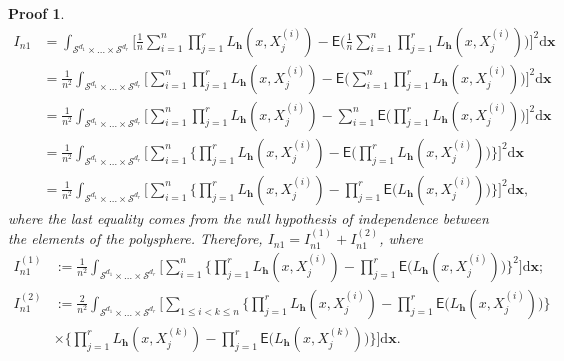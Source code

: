 \documentclass{article}
\newtheorem{Proof}{Proof}[section]
\begin{document}
\begin{Proof}
    \begin{align}
    I_{n1} &= \int_{\mathcal{S}^{d_1} \times \dots \times \mathcal{S}^{d_r}} \Bigg[ \frac{1}{n} \sum_{i=1}^{n} \prod_{j=1}^{r} L_{\mathbf{h}} (x,X_j^{(i)}) - \mathsf{E} \Big( \frac{1}{n} \sum_{i=1}^{n} \prod_{j=1}^{r} L_{\mathbf{h}} (x,X_j^{(i)}) \Big) \Bigg]^2 \mathrm{d} \mathbf{x} \\
    &= \frac{1}{n^2} \int_{\mathcal{S}^{d_1} \times \dots \times \mathcal{S}^{d_r}} \Bigg[ \sum_{i=1}^{n} \prod_{j=1}^{r} L_{\mathbf{h}} (x,X_j^{(i)}) - \mathsf{E} \Big( \sum_{i=1}^{n} \prod_{j=1}^{r} L_{\mathbf{h}} (x,X_j^{(i)}) \Big) \Bigg]^2 \mathrm{d} \mathbf{x} \\
    &= \frac{1}{n^2} \int_{\mathcal{S}^{d_1} \times \dots \times \mathcal{S}^{d_r}} \Bigg[ \sum_{i=1}^{n} \prod_{j=1}^{r} L_{\mathbf{h}} (x,X_j^{(i)}) - \sum_{i=1}^{n} \mathsf{E} \Big( \prod_{j=1}^{r} L_{\mathbf{h}} (x,X_j^{(i)}) \Big) \Bigg]^2 \mathrm{d} \mathbf{x} \\
    &= \frac{1}{n^2} \int_{\mathcal{S}^{d_1} \times \dots \times \mathcal{S}^{d_r}} \Bigg[ \sum_{i=1}^{n} \Bigg\{ \prod_{j=1}^{r} L_{\mathbf{h}} (x,X_j^{(i)}) - \mathsf{E} \Big( \prod_{j=1}^{r} L_{\mathbf{h}} (x,X_j^{(i)}) \Big) \Bigg\} \Bigg]^2 \mathrm{d} \mathbf{x} \\
    &= \frac{1}{n^2} \int_{\mathcal{S}^{d_1} \times \dots \times \mathcal{S}^{d_r}} \Bigg[ \sum_{i=1}^{n} \Bigg\{ \prod_{j=1}^{r} L_{\mathbf{h}} (x,X_j^{(i)}) - \prod_{j=1}^{r} \mathsf{E} \Big( L_{\mathbf{h}} (x,X_j^{(i)}) \Big) \Bigg\} \Bigg]^2 \mathrm{d} \mathbf{x},
\end{align}
where the last equality comes from the null hypothesis of independence between the elements of the polysphere. Therefore, $I_{n1} = I_{n1}^{(1)} + I_{n1}^{(2)}$, where
\begin{align}
    I_{n1}^{(1)} &:= \frac{1}{n^2} \int_{\mathcal{S}^{d_1} \times \dots \times \mathcal{S}^{d_r}} \Bigg[ \sum_{i=1}^{n} \Bigg\{ \prod_{j=1}^{r} L_{\mathbf{h}} (x,X_j^{(i)}) - \prod_{j=1}^{r} \mathsf{E} \Big( L_{\mathbf{h}} (x,X_j^{(i)}) \Big) \Bigg\}^2 \Bigg] \mathrm{d} \mathbf{x}; \\
    I_{n1}^{(2)} &:= \frac{2}{n^2} \int_{\mathcal{S}^{d_1} \times \dots \times \mathcal{S}^{d_r}} \Bigg[ \sum_{1 \le i<k \le n} \Bigg\{ \prod_{j=1}^{r} L_{\mathbf{h}} (x,X_j^{(i)}) - \prod_{j=1}^{r} \mathsf{E} \Big( L_{\mathbf{h}} (x,X_j^{(i)}) \Big) \Bigg\} \\
    &\times \Bigg\{ \prod_{j=1}^{r} L_{\mathbf{h}} (x,X_j^{(k)}) - \prod_{j=1}^{r} \mathsf{E} \Big( L_{\mathbf{h}} (x,X_j^{(k)}) \Big) \Bigg\} \Bigg] \mathrm{d} \mathbf{x}.

\end{align}
\end{Proof}
\end{document}
